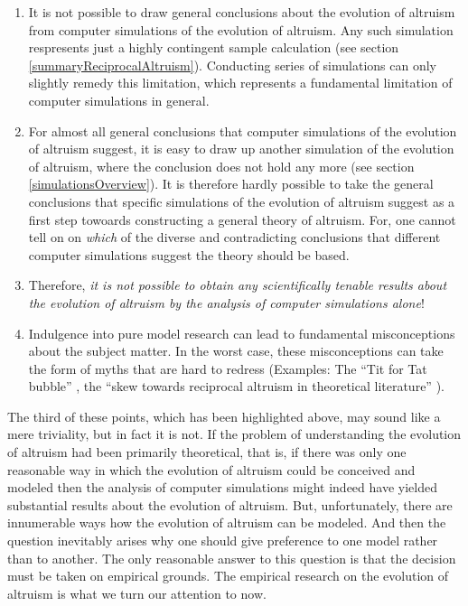 \begin{enumerate}
\item It is not possible to draw general conclusions about the evolution of
  altruism from computer simulations of the evolution of altruism. Any such
  simulation respresents just a highly contingent sample calculation
(see section
  \ref{summaryReciprocalAltruism}). Conducting series of simulations can only
  slightly remedy this limitation, which represents a fundamental limitation of
  computer simulations in general.

\item For almost all general conclusions that computer simulations of the
  evolution of altruism suggest, it is easy to draw up another simulation of
  the evolution of altruism, where the conclusion does not hold any more
  (see section \ref{simulationsOverview}). It is therefore hardly possible to take the 
  general conclusions that specific simulations of the evolution of altruism suggest as a first step
  towoards constructing a general theory of altruism. For, one cannot tell on on {\em which} of the diverse 
  and contradicting conclusions that different computer simulations suggest the 
  theory should be based.

\item Therefore, {\em it is not possible to obtain any scientifically tenable
    results about the evolution of altruism by the analysis of computer
    simulations alone}!

\item Indulgence into pure model research can lead to fundamental
  misconceptions about the subject matter. In the worst case, these
  misconceptions can take the form of myths that are hard to redress
  (Examples: The ``Tit for Tat bubble'' \cite[p.\ 317]{binmore:1998},
  the ``skew towards reciprocal altruism in theoretical literature'' \cite[p.\ 
  167]{dugatkin:1997}).

\end{enumerate}

The third of these points, which has been highlighted above, may sound like a
mere triviality, but in fact it is not. If the problem of understanding the
evolution of altruism had been primarily theoretical, that is, if there was
only one reasonable way in which the evolution of altruism could be conceived
and modeled then the analysis of computer simulations might indeed have
yielded substantial results about the evolution of altruism. But,
unfortunately, there are innumerable ways how the evolution of altruism
can be modeled. And then the question inevitably arises why one should give
preference to one model rather than to another. The only reasonable answer to
this question is that the decision must be taken on empirical grounds. The
empirical research on the evolution of altruism is what we turn our attention
to now.

